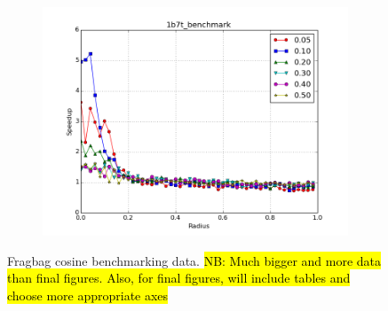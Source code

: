 \documentclass[review,preprint,12pt]{elsarticle}
\theoremstyle{definition}
\theoremstyle{remark}
\numberwithin{equation}{section}
\begin{document}
\begin{figure}[tbp]
\begin{subfigure}[b]{0.49\textwidth}
        \includegraphics[width=1\textwidth]{assets/1b7t_benchmark_cosine}
        \caption{}
    \end{subfigure}
    \caption{Fragbag cosine benchmarking data. \hl{NB: Much bigger and more data than final figures. Also, for final figures, will include tables and choose more appropriate axes}}
    \label{fig:fragbag_cosine}
\end{figure}
\end{document}
